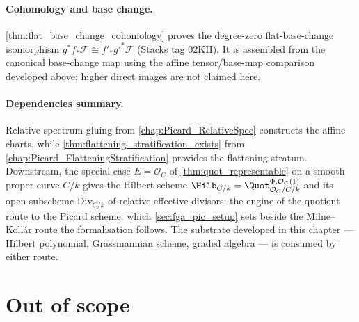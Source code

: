 \paragraph{Cohomology and base change.}
\cref{thm:flat_base_change_cohomology} proves the degree-zero flat-base-change
isomorphism \(g^*f_*\mathcal F\cong f'_*g'^*\mathcal F\) (Stacks tag 02KH).
It is assembled from the canonical base-change map using the affine
tensor/base-map comparison developed above; higher direct images are not
claimed here.

\paragraph{Dependencies summary.}
Relative-spectrum gluing from \cref{chap:Picard_RelativeSpec} constructs
the affine charts, while
\cref{thm:flattening_stratification_exists} from
\cref{chap:Picard_FlatteningStratification} provides the flattening stratum.
Downstream, the special case \(E = \mathcal{O}_C\) of
\cref{thm:quot_representable} on a smooth proper curve \(C/k\) gives the Hilbert
scheme \(\Hilb_{C/k} = \Quot^{\Phi,\mathcal{O}_C(1)}_{\mathcal{O}_C/C/k}\)
and its open subscheme \(\mathrm{Div}_{C/k}\) of relative effective divisors:
the engine of the quotient route to the Picard scheme, which
\cref{sec:fga_pic_setup} sets beside the Milne--Koll\'ar route the formalisation
follows.  The substrate developed in this chapter --- Hilbert polynomial,
Grassmannian scheme, graded algebra --- is consumed by either route.

\section{Out of scope}
\label{sec:quot_out_of_scope}

